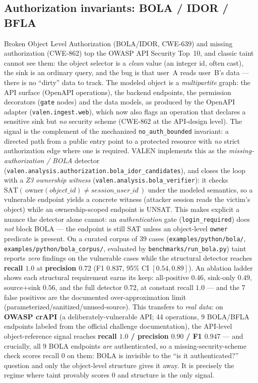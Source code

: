 \documentclass[11pt]{article}
\begin{document}
\subsection{Authorization invariants: BOLA / IDOR / BFLA}
Broken Object Level Authorization (BOLA/IDOR, CWE-639) and missing
authorization (CWE-862) top the OWASP API Security Top~10, and classic taint
cannot see them: the object selector is a \emph{clean} value (an integer id,
often cast), the sink is an ordinary query, and the bug is that user~A reads
user~B's data --- there is no ``dirty'' data to track. The modeled object is a
\emph{multipartite} graph: the API surface (OpenAPI operations), the backend
endpoints, the permission decorators (\texttt{gate} nodes) and the data models,
as produced by the OpenAPI adapter (\texttt{valen.ingest.web}), which now
also flags an operation that declares a sensitive sink but \emph{no} security
scheme (CWE-862 at the API-design level). The signal is the complement of the
mechanized \texttt{no\_auth\_bounded} invariant: a directed path from a public
entry point to a protected resource with \emph{no} strict authorization edge
where one is required. VALEN implements this as the \emph{missing-authorization
/ BOLA} detector (\texttt{valen.analysis.authorization.bola\_idor\_candidates}),
and closes the loop with a \emph{Z3 ownership witness}
(\texttt{valen.analysis.bola\_verifier}): it checks
$\mathrm{SAT}(\,\mathrm{owner}(object\_id)\neq session\_user\_id\,)$ under the
modeled semantics, so a vulnerable endpoint yields a concrete witness (attacker
session reads the victim's object) while an ownership-scoped endpoint is UNSAT.
This makes explicit a nuance the detector alone cannot: an \emph{authentication}
gate (\texttt{login\_required}) does \emph{not} block BOLA --- the endpoint is
still SAT unless an object-level \texttt{owner} predicate is present. On a
curated corpus of 39 cases (\texttt{examples/python/bola/},
\texttt{examples/python/bola\_corpus/}, evaluated by
\texttt{benchmarks/run\_bola.py}) taint reports \emph{zero} findings on the
vulnerable cases while the structural detector reaches \textbf{recall $1.0$} at
\textbf{precision $0.72$} (F1 $0.837$, 95\% CI $[0.54,0.89]$). An ablation ladder
shows each structural requirement earns its keep: all-positive $0.46$, sink-only
$0.49$, source+sink $0.56$, and the full detector $0.72$, at constant recall
$1.0$ --- and the 7 false positives are the documented over-approximation limit
(parameterized/sanitized/unused-source). This transfers to \emph{real data}: on
\textbf{OWASP crAPI} (a deliberately-vulnerable API; 44 operations, 9
BOLA/BFLA endpoints labeled from the official challenge documentation), the
API-level object-reference signal reaches \textbf{recall $1.0$ / precision
$0.90$ / F1 $0.947$} --- and crucially, all 9 BOLA endpoints \emph{are}
authenticated, so a missing-security-scheme check scores recall $0$ on them:
BOLA is invisible to the ``is it authenticated?'' question and only the
object-level structure gives it away. It is precisely the regime where taint
provably scores $0$ and structure is the only signal.
\end{document}
